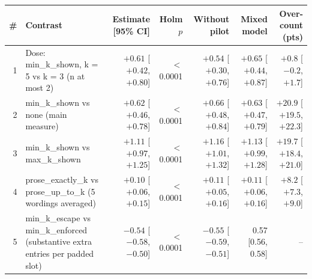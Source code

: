 \begin{tabular}{rlrrrrr}
  \toprule
  \# & Contrast & Estimate [95\% CI] & Holm $p$ & Without pilot & Mixed model & Over-count (pts) \\
  \midrule
  1 & Dose: min\_k\_shown, k = 5 vs k = 3 (n at most 2) & $+0.61$ [$+0.42$, $+0.80$] & $<$ 0.0001 & $+0.54$ [$+0.30$, $+0.76$] & $+0.65$ [$+0.44$, $+0.87$] & $+0.8$ [$-0.2$, $+1.7$] \\
  2 & min\_k\_shown vs none (main measure) & $+0.62$ [$+0.46$, $+0.78$] & $<$ 0.0001 & $+0.66$ [$+0.48$, $+0.84$] & $+0.63$ [$+0.47$, $+0.79$] & $+20.9$ [$+19.5$, $+22.3$] \\
  3 & min\_k\_shown vs max\_k\_shown & $+1.11$ [$+0.97$, $+1.25$] & $<$ 0.0001 & $+1.16$ [$+1.01$, $+1.32$] & $+1.13$ [$+0.99$, $+1.28$] & $+19.7$ [$+18.4$, $+21.0$] \\
  4 & prose\_exactly\_k vs prose\_up\_to\_k (5 wordings averaged) & $+0.10$ [$+0.06$, $+0.15$] & $<$ 0.0001 & $+0.11$ [$+0.05$, $+0.16$] & $+0.11$ [$+0.06$, $+0.16$] & $+8.2$ [$+7.3$, $+9.0$] \\
  5 & min\_k\_escape vs min\_k\_enforced (substantive extra entries per padded slot) & $-0.54$ [$-0.58$, $-0.50$] & $<$ 0.0001 & $-0.55$ [$-0.59$, $-0.51$] & 0.57 [0.56, 0.58] & -- \\
  \bottomrule
\end{tabular}
